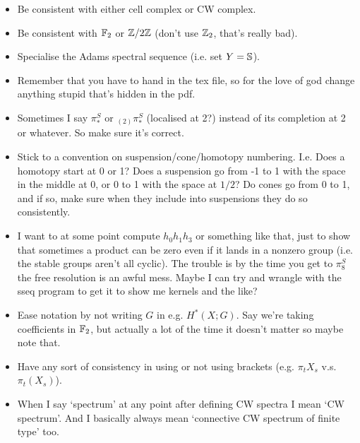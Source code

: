 \documentclass{MetricNotes2023}
\def\bb{\ensuremath\mathbb}
\def\inte{\ensuremath\mathbb{Z}}
\begin{document}
\begin{itemize}
\item Be consistent with either cell complex or CW complex.

\item Be consistent with \(\bb{F}_2\)  or \(\inte/2\inte\) (don't use \(\inte_2\), that's really bad).

\item Specialise the Adams spectral sequence (i.e. set \(Y=\bb{S}\)).

\item Remember that you have to hand in the tex file, so for the love of god change anything stupid that's hidden in the pdf.

\item Sometimes I say \(\pi_*^S\) or \(\text{}_{(2)}\pi_*^S\) (localised at 2?) instead of its completion at 2 or whatever. So make sure it's correct.

\item Stick to a convention on suspension/cone/homotopy numbering. I.e. Does a homotopy start at 0 or 1? Does a suspension go from -1 to 1 with the space in the middle at 0, or 0 to 1 with the space at \(1/2\)? Do cones go from 0 to 1, and if so, make sure when they include into suspensions they do so consistently. 

\item I want to at some point compute \(h_0h_1h_3\) or something like that, just to show that sometimes a product can be zero even if it lands in a nonzero group (i.e. the stable groups aren't all cyclic). The trouble is by the time you get to \(\pi_8^S\) the free resolution is an awful mess. Maybe I can try and wrangle with the sseq program to get it to show me kernels and the like?

\item Ease notation by not writing \(G\) in e.g. \(H^*(X;G)\). Say we're taking coefficients in \(\bb{F}_2\), but actually a lot of the time it doesn't matter so maybe note that.

\item Have any sort of consistency in using or not using brackets (e.g. \(\pi_t X_s\) v.s. \(\pi_t(X_s)\)). 

\item When I say `spectrum' at any point after defining CW spectra I mean `CW spectrum'. And I basically always mean `connective CW spectrum of finite type' too. 

\end{itemize}
\end{document}
